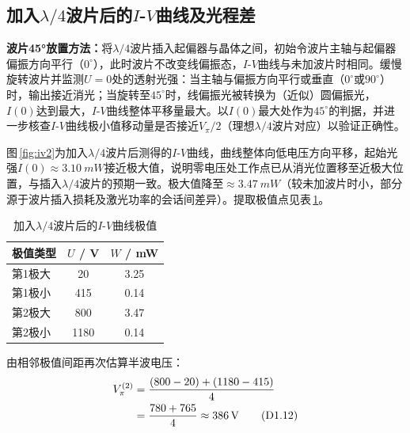 \documentclass[a4paper,8pt,twocolumn]{article}
\begin{document}
\subsection{加入$\lambda/4$波片后的$I$-$V$曲线及光程差}

\textbf{波片45°放置方法：}将$\lambda/4$波片插入起偏器与晶体之间，初始令波片主轴与起偏器偏振方向平行（$0^\circ$），此时波片不改变线偏振态，$I$-$V$曲线与未加波片时相同。缓慢旋转波片并监测$U=0$处的透射光强：当主轴与偏振方向平行或垂直（$0^\circ$或$90^\circ$）时，输出接近消光；当旋转至$45^\circ$时，线偏振光被转换为（近似）圆偏振光，$I(0)$达到最大，$I$-$V$曲线整体平移量最大。以$I(0)$最大处作为$45^\circ$的判据，并进一步核查$I$-$V$曲线极小值移动量是否接近$V_\pi/2$（理想$\lambda/4$波片对应）以验证正确性。

图\,\ref{fig:iv2}为加入$\lambda/4$波片后测得的$I$-$V$曲线，曲线整体向低电压方向平移，起始光强$I(0)\approx\SI{3.10}{mW}$接近极大值，说明零电压处工作点已从消光位置移至近极大位置，与插入$\lambda/4$波片的预期一致。极大值降至$\approx\SI{3.47}{mW}$（较未加波片时小，部分源于波片插入损耗及激光功率的会话间差异）。提取极值点见表\,\ref{tab:peaks2}。

\begin{table}[H]
\centering
\caption{加入$\lambda/4$波片后的$I$-$V$曲线极值}
\label{tab:peaks2}
\begin{tabular}{lcc}
\toprule
极值类型 & $U$ / \si{V} & $W$ / \si{mW} \\
\midrule
第1极大 & 20  & 3.25 \\
第1极小 & 415 & 0.14 \\
第2极大 & 800 & 3.47 \\
第2极小 & 1180 & 0.14 \\
\bottomrule
\end{tabular}
\end{table}

由相邻极值间距再次估算半波电压：
\begin{align}
  V_\pi^{(2)} &= \frac{(800-20)+(1180-415)}{4}
  \notag\\
  &= \frac{780+765}{4} \approx \SI{386}{V}
  \tag{D1.12}
\end{align}
\end{document}
